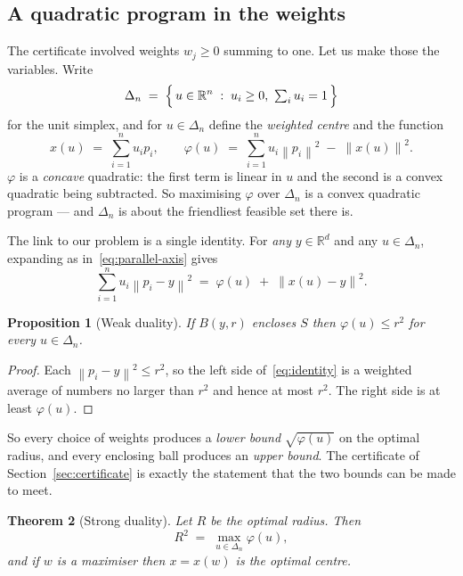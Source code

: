 \documentclass[11pt,a4paper]{article}
\theoremstyle{plain}
\newtheorem{theorem}{Theorem}[section]
\newtheorem{proposition}[theorem]{Proposition}
\theoremstyle{definition}
\theoremstyle{remark}
\newcommand{\R}{\mathbb{R}}
\newcommand{\norm}[1]{\left\lVert #1 \right\rVert}
\newcommand{\simplex}{\Delta_n}
\begin{document}
\subsection{A quadratic program in the weights}

The certificate involved weights $w_j\ge0$ summing to one. Let us make those the
variables. Write
\[
  \simplex \;=\; \Bigl\{\, u \in \R^n \;:\; u_i \ge 0, \ \textstyle\sum_i u_i = 1 \,\Bigr\}
\]
for the unit simplex, and for $u\in\simplex$ define the \emph{weighted centre}
and the function
\begin{equation}
  \label{eq:phi}
  x(u) \;=\; \sum_{i=1}^n u_i p_i,
  \qquad
  \varphi(u) \;=\; \sum_{i=1}^n u_i \norm{p_i}^2 \;-\; \norm{x(u)}^2 .
\end{equation}
$\varphi$ is a \emph{concave} quadratic: the first term is linear in $u$ and the
second is a convex quadratic being subtracted. So maximising $\varphi$ over
$\simplex$ is a convex quadratic program --- and $\simplex$ is about the friendliest
feasible set there is.

The link to our problem is a single identity. For \emph{any} $y\in\R^d$ and any
$u\in\simplex$, expanding as in~\eqref{eq:parallel-axis} gives
\begin{equation}
  \label{eq:identity}
  \sum_{i=1}^n u_i \norm{p_i - y}^2 \;=\; \varphi(u) \;+\; \norm{x(u) - y}^2 .
\end{equation}

\begin{proposition}[Weak duality]
  \label{prop:weak}
  If $B(y,r)$ encloses $S$ then $\varphi(u)\le r^2$ for every $u\in\simplex$.
\end{proposition}

\begin{proof}
  Each $\norm{p_i-y}^2 \le r^2$, so the left side of~\eqref{eq:identity} is a
  weighted average of numbers no larger than $r^2$ and hence at most $r^2$. The
  right side is at least $\varphi(u)$.
\end{proof}

So every choice of weights produces a \emph{lower bound} $\sqrt{\varphi(u)}$ on
the optimal radius, and every enclosing ball produces an \emph{upper bound}. The
certificate of Section~\ref{sec:certificate} is exactly the statement that the two
bounds can be made to meet.

\begin{theorem}[Strong duality]
  \label{thm:strong}
  Let $R$ be the optimal radius. Then
  \[
    R^2 \;=\; \max_{u\in\simplex} \varphi(u),
  \]
  and if $w$ is a maximiser then $x=x(w)$ is the optimal centre.
\end{theorem}
\end{document}
